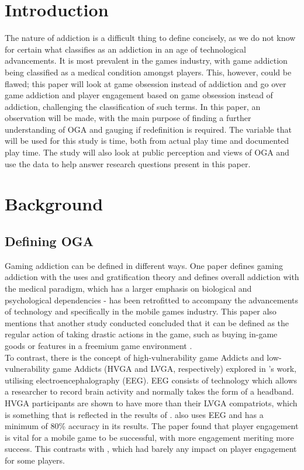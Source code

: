 \documentclass[conference]{IEEEtran}
\begin{document}
\section{Introduction}
The nature of addiction is a difficult thing to define concisely, as we do not know for certain what classifies as an addiction in an age of technological advancements. It is most prevalent in the games industry, with game addiction being classified as a medical condition \cite{NHSHamp24} amongst players. This, however, could be flawed; this paper will look at game obsession instead of addiction and go over game addiction and player engagement based on game obsession instead of addiction, challenging the classification of such terms. In this paper, an observation will be made, with the main purpose of finding a further understanding of OGA and gauging if redefinition is required. The variable that will be used for this study is time, both from actual play time and documented play time. The study will also look at public perception and views of OGA and use the data to help answer research questions present in this paper.

\section{Background}
\subsection {Defining OGA}
Gaming addiction can be defined in different ways. One paper \cite{yasir2021} defines gaming addiction with the uses and gratification theory and defines overall addiction with the medical paradigm, which has a larger emphasis on biological and psychological dependencies - has been retrofitted to accompany the advancements of technology and specifically in the mobile games industry. This paper also mentions that another study conducted concluded that it can be defined as the regular action of taking drastic actions in the game, such as buying in-game goods or features in a freemium game environment \cite{XWang2021}. \\

To contrast, there is the concept of high-vulnerability game Addicts and low-vulnerability game Addicts (HVGA and LVGA, respectively) explored in \cite{Jing2024}’s work, utilising electroencephalography (EEG). EEG consists of technology which allows a researcher to record brain activity and normally takes the form of a headband. HVGA participants are shown to have more than their LVGA compatriots, which is something that is reflected in the results of \cite{Naaj2021}. \cite{Ruqeyya2022} also uses EEG and has a minimum of 80\% accuracy in its results. The paper found that player engagement is vital for a mobile game to be successful, with more engagement meriting more success. This contrasts with \cite{Schlagowski2024}, which had barely any impact on player engagement for some players.\\
\end{document}
